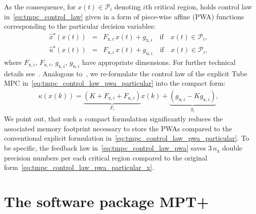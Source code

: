 \documentclass[letterpaper, 10 pt, conference]{ieeeconf}
\begin{document}
As the consequence, for $x(t) \in \mathcal{P}_{i}$ denoting $i$th critical region, holds control law in~\eqref{eq:tmpc_control_law} given in a form of
piece-wise affine (PWA) functions corresponding to the particular decision variables:
\begin{subequations}
	\label{eq:tmpc_control_law_pwa_particular}
	\begin{eqnarray}
		\label{eq:tmpc_control_law_pwa_particular_x}
		\hat{x}^{\star}(x(t)) \!\!\!\!&=&\!\!\!\! F_{\mathrm{x},i} \, x(t) + g_{\mathrm{x},i} \quad \text{if} \quad x(t) \in \mathcal{P}_{i}, \\
		\label{eq:tmpc_control_law_pwa_particular_u}
		\hat{u}^{\star}(x(t)) \!\!\!\!&=&\!\!\!\! F_{\mathrm{u},i} \, x(t) + g_{\mathrm{u},i} \quad \text{if} \quad x(t) \in \mathcal{P}_{i},
	\end{eqnarray}
\end{subequations}
where $F_{\mathrm{x},i}$, $F_{\mathrm{u},i}$, $g_{\mathrm{x},i}$, $g_{\mathrm{u},i}$ have appropriate dimensions. For further technical details see~\cite{BM02}. 
Analogous to~\cite{ZT14}, we re-formulate the control law of the explicit Tube MPC in~\eqref{eq:tmpc_control_law_pwa_particular} into the compact form:
\begin{eqnarray}
	\label{eq:tmpc_control_law_pwa}
	\kappa(x(k)) = \underbrace{ \left( K + F_{\mathrm{x},i} + F_{\mathrm{u},i} \right) }_{ F_{i} } x(k) + \underbrace{ \left( g_{\mathrm{u},i} - K g_{\mathrm{x},i} \right) }_{ g_{i} } ,
\end{eqnarray}
We point out, that such a compact formulation significantly reduces the associated memory footprint necessary to store the PWAs compared to the conventional explicit formulation in~\eqref{eq:tmpc_control_law_pwa_particular}.  
%
To be specific, the feedback law in~\eqref{eq:tmpc_control_law_pwa} saves $3\,n_\text{x}$ double precision numbers per each critical region compared to the original form~\eqref{eq:tmpc_control_law_pwa_particular_x}.
%

\section{The software package MPT+}
\label{sec:code}
\end{document}

